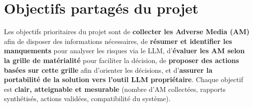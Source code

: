 \section{Objectifs partagés du projet}
Les objectifs prioritaires du projet sont de \textbf{collecter les Adverse Media (AM)} afin de disposer des informations nécessaires, de \textbf{résumer et identifier les manquements} pour analyser les risques via le LLM, d’\textbf{évaluer les AM selon la grille de matérialité} pour faciliter la décision, de \textbf{proposer des actions basées sur cette grille} afin d’orienter les décisions, et d’\textbf{assurer la portabilité de la solution vers l’outil LLM propriétaire}. Chaque objectif est \textbf{clair, atteignable et mesurable} (nombre d’AM collectées, rapports synthétisés, actions validées, compatibilité du système).
